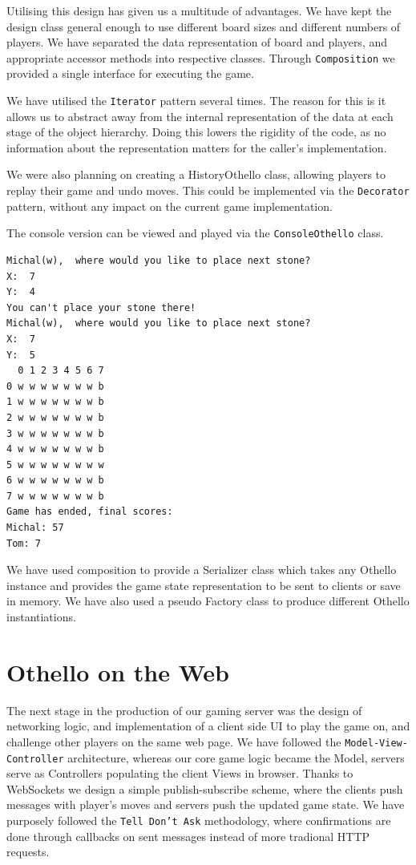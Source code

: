 \documentclass[a4wide, 11pt]{article}
\begin{document}
Utilising this design has given us a multitude of advantages. We have kept the design class general enough to use different board sizes and different numbers of players. We have separated the data representation of board and players, and appropriate accessor methods into respective classes. Through \texttt{Composition} we provided a single interface for executing the game.

We have utilised the \texttt{Iterator} pattern several times. The reason for this is it allows us to abstract away from the internal representation of the data at each stage of the object hierarchy. Doing this lowers the rigidity of the code, as no information about the representation matters for the caller's implementation.

We were also planning on creating a HistoryOthello class, allowing players to replay their game and undo moves. This could be implemented via the \texttt{Decorator} pattern, without any impact on the current game implementation.

The console version can be viewed and played via the \texttt{ConsoleOthello} class.

\begin{verbatim}
Michal(w),  where would you like to place next stone?
X:  7
Y:  4
You can't place your stone there!
Michal(w),  where would you like to place next stone?
X:  7
Y:  5
  0 1 2 3 4 5 6 7
0 w w w w w w w b
1 w w w w w w w b
2 w w w w w w w b
3 w w w w w w w b
4 w w w w w w w b
5 w w w w w w w w
6 w w w w w w w b
7 w w w w w w w b
Game has ended, final scores:
Michal: 57
Tom: 7

\end{verbatim}

We have used composition to provide a Serializer class which takes any Othello instance and provides the game state representation to be sent to clients or save in memory. We have also used a pseudo Factory class to produce different Othello instantiations.

\section{Othello on the Web}

The next stage in the production of our gaming server was the design of networking logic, and implementation of a client side UI to play the game on, and challenge other players on the same web page. We have followed the \texttt{Model-View-Controller} architecture, whereas our core game logic became the Model, servers serve as Controllers populating the client Views in browser. Thanks to WebSockets we design a simple publish-subscribe scheme, where the clients push messages with player's moves and servers push the updated game state. We have purposely followed the \texttt{Tell Don't Ask} methodology, where confirmations are done through callbacks on sent messages instead of more tradional HTTP requests.
\end{document}
